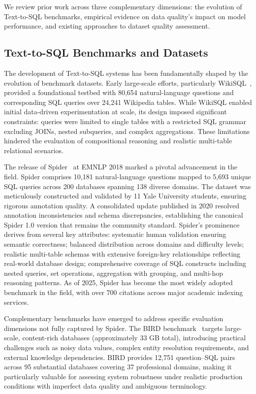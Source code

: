 \documentclass[]{einformatica}
\begin{document}
We review prior work across three complementary dimensions: the evolution of Text-to-SQL benchmarks, empirical evidence on data quality's impact on model performance, and existing approaches to dataset quality assessment.

\subsection{Text-to-SQL Benchmarks and Datasets}

The development of Text-to-SQL systems has been fundamentally shaped by the evolution of benchmark datasets. Early large-scale efforts, particularly WikiSQL~\cite{zhong2017seq2sql}, provided a foundational testbed with 80,654 natural-language questions and corresponding SQL queries over 24,241 Wikipedia tables. While WikiSQL enabled initial data-driven experimentation at scale, its design imposed significant constraints: queries were limited to single tables with a restricted SQL grammar excluding JOINs, nested subqueries, and complex aggregations. These limitations hindered the evaluation of compositional reasoning and realistic multi-table relational scenarios.

The release of Spider~\cite{yu2018spider} at EMNLP 2018 marked a pivotal advancement in the field. Spider comprises 10,181 natural-language questions mapped to 5,693 unique SQL queries across 200 databases spanning 138 diverse domains. The dataset was meticulously constructed and validated by 11 Yale University students, ensuring rigorous annotation quality. A consolidated update published in 2020 resolved annotation inconsistencies and schema discrepancies, establishing the canonical Spider 1.0 version that remains the community standard. Spider's prominence derives from several key attributes: systematic human validation ensuring semantic correctness; balanced distribution across domains and difficulty levels; realistic multi-table schemas with extensive foreign-key relationships reflecting real-world database design; comprehensive coverage of SQL constructs including nested queries, set operations, aggregation with grouping, and multi-hop reasoning patterns. As of 2025, Spider has become the most widely adopted benchmark in the field, with over 700 citations across major academic indexing services.

Complementary benchmarks have emerged to address specific evaluation dimensions not fully captured by Spider. The BIRD benchmark~\cite{li2023bird} targets large-scale, content-rich databases (approximately 33 GB total), introducing practical challenges such as noisy data values, complex entity resolution requirements, and external knowledge dependencies. BIRD provides 12,751 question--SQL pairs across 95 substantial databases covering 37 professional domains, making it particularly valuable for assessing system robustness under realistic production conditions with imperfect data quality and ambiguous terminology.
\end{document}
